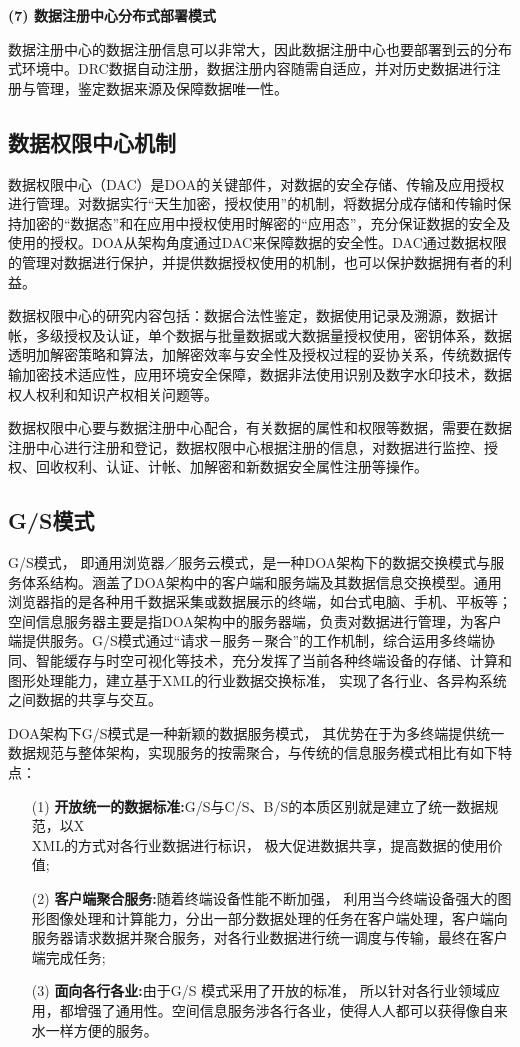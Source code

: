 \documentclass[article]{BJTU-thesis}
\begin{document}
	\noindent\textbf{(7) 数据注册中心分布式部署模式}

	数据注册中心的数据注册信息可以非常大，因此数据注册中心也要部署到云的分布式环境中。DRC数据自动注册，数据注册内容随需自适应，并对历史数据进行注册与管理，鉴定数据来源及保障数据唯一性。 
	
	\subsection{数据权限中心机制}
	数据权限中心（DAC）是DOA的关键部件，对数据的安全存储、传输及应用授权进行管理。对数据实行“天生加密，授权使用”的机制，将数据分成存储和传输时保持加密的“数据态”和在应用中授权使用时解密的“应用态”，充分保证数据的安全及使用的授权。DOA从架构角度通过DAC来保障数据的安全性。DAC通过数据权限的管理对数据进行保护，并提供数据授权使用的机制，也可以保护数据拥有者的利益。
	
	数据权限中心的研究内容包括：数据合法性鉴定，数据使用记录及溯源，数据计帐，多级授权及认证，单个数据与批量数据或大数据量授权使用，密钥体系，数据透明加解密策略和算法，加解密效率与安全性及授权过程的妥协关系，传统数据传输加密技术适应性，应用环境安全保障，数据非法使用识别及数字水印技术，数据权人权利和知识产权相关问题等。
	
	数据权限中心要与数据注册中心配合，有关数据的属性和权限等数据，需要在数据注册中心进行注册和登记，数据权限中心根据注册的信息，对数据进行监控、授权、回收权利、认证、计帐、加解密和新数据安全属性注册等操作\cite{la}。
	
	\subsection{G/S模式}
	G/S模式， 即通用浏览器／服务云模式，是一种DOA架构下的数据交换模式与服务体系结构。涵盖了DOA架构中的客户端和服务端及其数据信息交换模型。通用浏览器指的是各种用千数据采集或数据展示的终端，如台式电脑、手机、平板等；空间信息服务器主要是指DOA架构中的服务器端，负责对数据进行管理，为客户端提供服务。G/S模式通过“请求－服务－聚合”的工作机制，综合运用多终端协同、智能缓存与时空可视化等技术，充分发挥了当前各种终端设备的存储、计算和图形处理能力，建立基于XML的行业数据交换标准， 实现了各行业、各异构系统之间数据的共享与交互\cite{lb}。
	
	DOA架构下G/S模式是一种新颖的数据服务模式， 其优势在于为多终端提供统一数据规范与整体架构，实现服务的按需聚合，与传统的信息服务模式相比有如下特点：
	\begin{enumerate}
		\item[(1)] 	\textbf{开放统一的数据标准:}G/S与C/S、B/S的本质区别就是建立了统一数据规范，以X\\XML的方式对各行业数据进行标识， 极大促进数据共享，提高数据的使用价值;
		\item[(2)] \textbf{客户端聚合服务:}随着终端设备性能不断加强， 利用当今终端设备强大的图形图像处理和计算能力，分出一部分数据处理的任务在客户端处理，客户端向服务器请求数据并聚合服务，对各行业数据进行统一调度与传输，最终在客户端完成任务;
		\item[(3)] \textbf{面向各行各业:}由于G/S 模式采用了开放的标准， 所以针对各行业领域应用，都增强了通用性。空间信息服务涉各行各业，使得人人都可以获得像自来水一样方便的服务。
	\end{enumerate}
	
\end{document}
